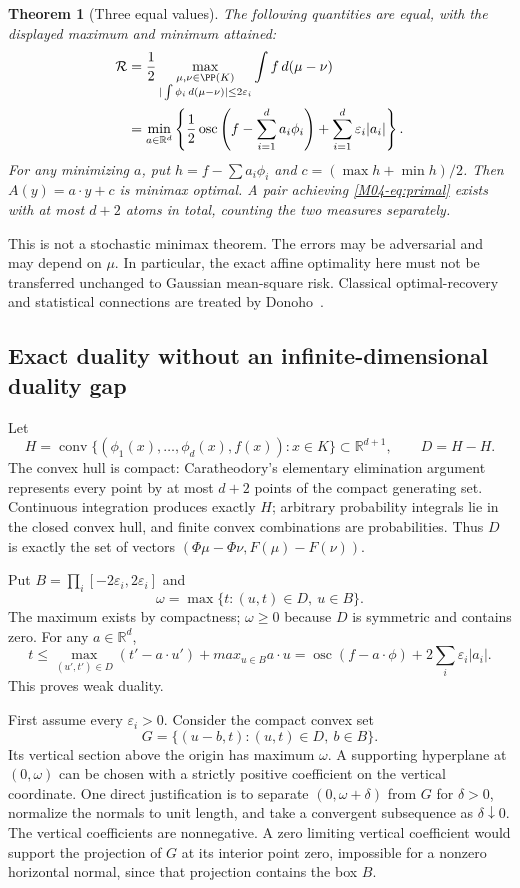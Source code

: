 \documentclass[11pt,a4paper]{article}
\newtheorem{theorem}{Theorem}[section]
\theoremstyle{definition}\newtheorem{definition}[theorem]{Definition}
\theoremstyle{remark}\newtheorem{remark}[theorem]{Remark}
\newcommand{\R}{\mathbb R}\newcommand{\C}{\mathbb C}\newcommand{\N}{\mathbb N}
\numberwithin{equation}{section}
\begin{document}
\begin{theorem}[Three equal values]\label{M04-th:main}
The following quantities are equal, with the displayed maximum and minimum attained:
\begin{align}
 \mathcal R
 &=\frac12\max_{\substack{\mu,\nu\in\PP(K)\\
       |\int\phi_i\,d(\mu-\nu)|\le2\varepsilon_i}}
       \int f\,d(\mu-\nu)\label{M04-eq:primal}\\
 &=\min_{a\in\R^d}\left\{\frac12\operatorname{osc}
       \left(f-\sum_{i=1}^da_i\phi_i\right)
            +\sum_{i=1}^d\varepsilon_i|a_i|\right\}.\label{M04-eq:dual}
\end{align}
For any minimizing $a$, put $h=f-\sum a_i\phi_i$ and $c=(\max h+\min h)/2$. Then $A(y)=a\cdot y+c$ is minimax optimal. A pair achieving \eqref{M04-eq:primal} exists with at most $d+2$ atoms in total, counting the two measures separately.
\end{theorem}
This is not a stochastic minimax theorem. The errors may be adversarial and may depend on $\mu$. In particular, the exact affine optimality here must not be transferred unchanged to Gaussian mean-square risk. Classical optimal-recovery and statistical connections are treated by Donoho~\cite{ref017}.

\subsection{Exact duality without an infinite-dimensional duality gap}\label{M04-sec-2}
Let
\[
 H=\operatorname{conv}\{(\phi_1(x),\ldots,\phi_d(x),f(x)):x\in K\}
 \subset\R^{d+1},\qquad D=H-H.
\]
The convex hull is compact: Caratheodory's elementary elimination argument represents every point by at most $d+2$ points of the compact generating set. Continuous integration produces exactly $H$; arbitrary probability integrals lie in the closed convex hull, and finite convex combinations are probabilities. Thus $D$ is exactly the set of vectors
$(\Phi\mu-\Phi\nu,F(\mu)-F(\nu))$.

Put $B=\prod_i[-2\varepsilon_i,2\varepsilon_i]$ and
\[
 \omega=\max\{t:(u,t)\in D,\ u\in B\}.
\]
The maximum exists by compactness; $\omega\ge0$ because $D$ is symmetric and contains zero. For any $a\in\R^d$,
\[
 t\le\max_{(u',t')\in D}(t'-a\cdot u')+max_{u\in B}a\cdot u
 =\operatorname{osc}(f-a\cdot\phi)+2\sum_i\varepsilon_i|a_i|.
\tag{M04.3}
\]
This proves weak duality.

First assume every $\varepsilon_i>0$. Consider the compact convex set
\[
 G=\{(u-b,t):(u,t)\in D,\ b\in B\}.
\]
Its vertical section above the origin has maximum $\omega$. A supporting hyperplane at $(0,\omega)$ can be chosen with a strictly positive coefficient on the vertical coordinate. One direct justification is to separate $(0,\omega+\delta)$ from $G$ for $\delta>0$, normalize the normals to unit length, and take a convergent subsequence as $\delta\downarrow0$. The vertical coefficients are nonnegative. A zero limiting vertical coefficient would support the projection of $G$ at its interior point zero, impossible for a nonzero horizontal normal, since that projection contains the box $B$.
\end{document}
